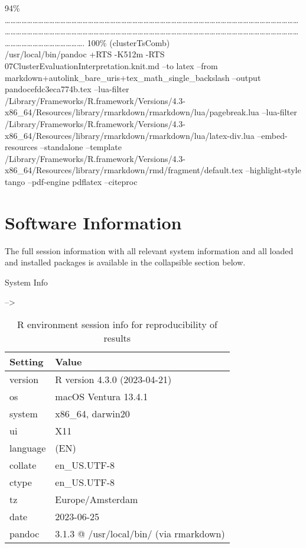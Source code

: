 \documentclass[
]{article}
\begin{document}
\textbar{} 94\% \textbar{}
\textbar\ldots\ldots\ldots\ldots\ldots\ldots\ldots\ldots\ldots\ldots\ldots\ldots\ldots\ldots\ldots\ldots\ldots\ldots\ldots\ldots\ldots\ldots\ldots\ldots\ldots\ldots\ldots\ldots\ldots\ldots\ldots\ldots\ldots\ldots\ldots\ldots\ldots\ldots\ldots\ldots\ldots\ldots\ldots\ldots\ldots\ldots\ldots\ldots\ldots\ldots\ldots\ldots\ldots\ldots\ldots\ldots\ldots\ldots\ldots\ldots\ldots\ldots\ldots\ldots\ldots\ldots\ldots\ldots\ldots\ldots\ldots\ldots\ldots\ldots\ldots\ldots\ldots\ldots\ldots\ldots\ldots\ldots\ldots\ldots\ldots\ldots\ldots\ldots\ldots\ldots\ldots\ldots\ldots\ldots\ldots\ldots\ldots\ldots\ldots\ldots\ldots\ldots\ldots\ldots\ldots\ldots\ldots\ldots\ldots\ldots\ldots\ldots\ldots\ldots\ldots\ldots\ldots\ldots\ldots\ldots.\textbar{}
100\% (clusterTsComb)\\
/usr/local/bin/pandoc +RTS -K512m -RTS
07ClusterEvaluationInterpretation.knit.md --to latex --from
markdown+autolink\_bare\_uris+tex\_math\_single\_backslash --output
pandocefdc3eca774b.tex --lua-filter
/Library/Frameworks/R.framework/Versions/4.3-x86\_64/Resources/library/rmarkdown/rmarkdown/lua/pagebreak.lua
--lua-filter
/Library/Frameworks/R.framework/Versions/4.3-x86\_64/Resources/library/rmarkdown/rmarkdown/lua/latex-div.lua
--embed-resources --standalone --template
/Library/Frameworks/R.framework/Versions/4.3-x86\_64/Resources/library/rmarkdown/rmd/fragment/default.tex
--highlight-style tango --pdf-engine pdflatex --citeproc

\hypertarget{software-information}{%
\section{Software Information}\label{software-information}}

The full session information with all relevant system information and
all loaded and installed packages is available in the collapsible
section below.

System Info

--\textgreater{}

\begin{table}

\caption{\label{tab:Reproducibility-sessionInfo-R-environment}R environment session info for reproducibility of results}
\centering
\begin{tabular}[t]{ll}
\toprule
Setting & Value\\
\midrule
version & R version 4.3.0 (2023-04-21)\\
os & macOS Ventura 13.4.1\\
system & x86\_64, darwin20\\
ui & X11\\
language & (EN)\\
\addlinespace
collate & en\_US.UTF-8\\
ctype & en\_US.UTF-8\\
tz & Europe/Amsterdam\\
date & 2023-06-25\\
pandoc & 3.1.3 @ /usr/local/bin/ (via rmarkdown)\\
\bottomrule
\end{tabular}
\end{table}
\end{document}
